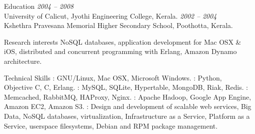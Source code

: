 \documentclass{resume}
\author{Sreejith Kesavan}
\begin{document}
\maketitle


\begin{category}{Education}
 \hfill {\em 2004 -- 2008}\\
University of Calicut, Jyothi Engineering College, Kerala.
 \hfill {\em 2002 -- 2004}\\
Kshethra Pravesana Memorial Higher Secondary School, Poothotta, Kerala.
\end{category}


\begin{category}{Research interests}
\citemnobullet NoSQL databases, application development for Mac OSX \& iOS, 
distributed and concurrent programming with Erlang, Amazon Dynamo architecture.
\end{category}

\begin{category}{Technical Skills}
: GNU/Linux, Mac OSX, Microsoft Windows.
: Python, Objective C, C, Erlang.
: MySQL, SQLite, Hypertable, MongoDB, Riak, Redis.
: Memcached, RabbitMQ, HAProxy, Nginx.
: Apache Hadoop, Google App Engine, Amazon EC2, Amazon S3.
: Design and development of scalable web services, Big Data, 
NoSQL databases, virtualization, Infrastructure as a Service, Platform as a Service, 
userspace filesystems, Debian and RPM package management.
\end{category}

\end{document}
